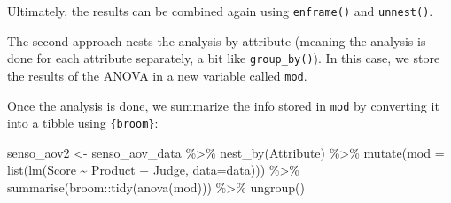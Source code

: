 \documentclass[
]{book}
\newenvironment{Shaded}{\begin{snugshade}}{\end{snugshade}}
\newcommand{\AttributeTok}[1]{\textcolor[rgb]{0.77,0.63,0.00}{#1}}
\newcommand{\ControlFlowTok}[1]{\textcolor[rgb]{0.13,0.29,0.53}{\textbf{#1}}}
\newcommand{\FunctionTok}[1]{\textcolor[rgb]{0.00,0.00,0.00}{#1}}
\newcommand{\NormalTok}[1]{#1}
\newcommand{\OtherTok}[1]{\textcolor[rgb]{0.56,0.35,0.01}{#1}}
\newcommand{\SpecialCharTok}[1]{\textcolor[rgb]{0.00,0.00,0.00}{#1}}
\newcommand{\StringTok}[1]{\textcolor[rgb]{0.31,0.60,0.02}{#1}}
\begin{document}
Ultimately, the results can be combined again using \texttt{enframe()} and \texttt{unnest()}.

\begin{Shaded}
\end{Shaded}

The second approach nests the analysis by attribute (meaning the analysis is done for each attribute separately, a bit like \texttt{group\_by()}). In this case, we store the results of the ANOVA in a new variable called \texttt{mod}.

Once the analysis is done, we summarize the info stored in \texttt{mod} by converting it into a tibble using \texttt{\{broom\}}:

\begin{Shaded}
\begin{Highlighting}[]
\NormalTok{senso\_aov2 }\OtherTok{\textless{}{-}}\NormalTok{ senso\_aov\_data }\SpecialCharTok{\%\textgreater{}\%} 
  \FunctionTok{nest\_by}\NormalTok{(Attribute) }\SpecialCharTok{\%\textgreater{}\%} 
  \FunctionTok{mutate}\NormalTok{(}\AttributeTok{mod =} \FunctionTok{list}\NormalTok{(}\FunctionTok{lm}\NormalTok{(Score }\SpecialCharTok{\textasciitilde{}}\NormalTok{ Product }\SpecialCharTok{+}\NormalTok{ Judge, }\AttributeTok{data=}\NormalTok{data))) }\SpecialCharTok{\%\textgreater{}\%} 
  \FunctionTok{summarise}\NormalTok{(broom}\SpecialCharTok{::}\FunctionTok{tidy}\NormalTok{(}\FunctionTok{anova}\NormalTok{(mod))) }\SpecialCharTok{\%\textgreater{}\%} 
  \FunctionTok{ungroup}\NormalTok{()}
\end{Highlighting}
\end{Shaded}
\end{document}
